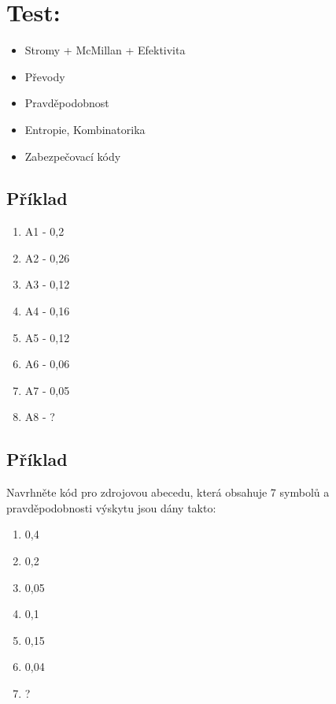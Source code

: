 \documentclass{article}
\begin{document}
\section{Test:}
\begin{itemize}
    \item Stromy + McMillan + Efektivita
    \item Převody
    \item Pravděpodobnost
    \item Entropie, Kombinatorika
    \item Zabezpečovací kódy
\end{itemize}

\subsection{Příklad}
\begin{enumerate}
    \item A1 - 0,2
    \item A2 - 0,26
    \item A3 - 0,12
    \item A4 - 0,16
    \item A5 - 0,12
    \item A6 - 0,06
    \item A7 - 0,05
    \item A8 - ?
\end{enumerate}

\subsection{Příklad}
Navrhněte kód pro zdrojovou abecedu, která obsahuje 7 symbolů a pravděpodobnosti výskytu jsou dány takto:
\begin{enumerate}
    \item 0,4
    \item 0,2
    \item 0,05
    \item 0,1
    \item 0,15
    \item 0,04
    \item ?
\end{enumerate}
\end{document}
